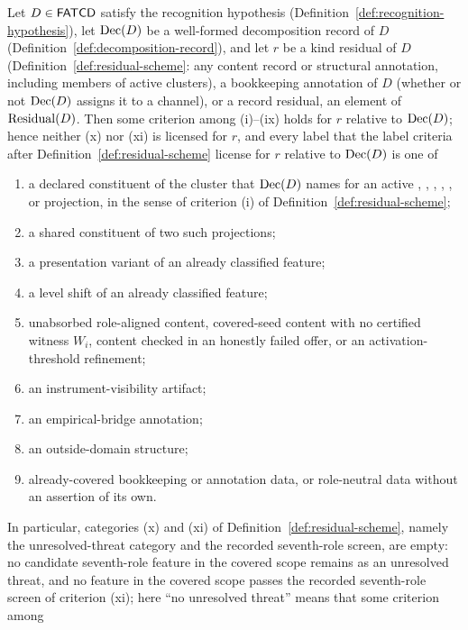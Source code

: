 \begin{theorem}\label{thm:upper-bound-classification}
Let \(D \in \mathsf{FATCD}{}\) satisfy the recognition hypothesis
(Definition~\ref{def:recognition-hypothesis}), let \(\operatorname{Dec}\!\left(D\right)\) be a
well-formed decomposition record of \(D\)
(Definition~\ref{def:decomposition-record}), and let \(r\) be a kind residual
of \(D\) (Definition~\ref{def:residual-scheme}: any content record or structural
annotation, including members of active clusters), a bookkeeping annotation of \(D\) (whether or not \(\operatorname{Dec}\!\left(D\right)\) assigns it to a channel), or a record residual, an
element of \(\operatorname{Residual}\!\left(D\right)\). Then some criterion among (i)--(ix) holds for \(r\) relative to \(\operatorname{Dec}\!\left(D\right)\); hence neither (x) nor (xi) is licensed for \(r\), and
every label that the label criteria after Definition~\ref{def:residual-scheme}
license for \(r\) relative to \(\operatorname{Dec}\!\left(D\right)\) is one of
\begin{enumerate}[label=(\roman*),topsep=2pt,itemsep=1pt]
  \item a declared constituent of the cluster that \(\operatorname{Dec}\!\left(D\right)\) names for an
    active \Pone{}, \Ptwo{}, \Pthree{}, \Pfour{}, \Pfive{}, or \Psix{}
    projection, in the sense of criterion (i) of Definition~\ref{def:residual-scheme};
  \item a shared constituent of two such projections;
  \item a presentation variant of an already classified feature;
  \item a level shift of an already classified feature;
  \item unabsorbed role-aligned content, covered-seed content with no
    certified witness \(W_i\), content checked in an honestly failed offer, or an activation-threshold refinement;
  \item an instrument-visibility artifact;
  \item an empirical-bridge annotation;
  \item an outside-domain structure;
  \item already-covered bookkeeping or annotation data, or role-neutral data
    without an assertion of its own.
\end{enumerate}
In particular, categories (x) and (xi) of
Definition~\ref{def:residual-scheme}, namely the unresolved-threat category and the recorded seventh-role
screen, are empty: no candidate
seventh-role feature in the covered scope remains as an unresolved threat, and
no feature in the covered scope passes the recorded seventh-role screen of
criterion (xi); here ``no unresolved threat'' means that some criterion among

\end{theorem}
